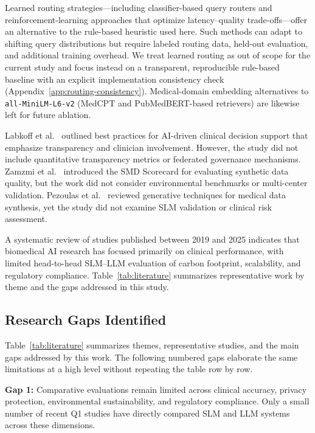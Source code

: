 Learned routing strategies---including classifier-based query routers and reinforcement-learning approaches that optimize latency--quality trade-offs---offer an alternative to the rule-based heuristic used here. Such methods can adapt to shifting query distributions but require labeled routing data, held-out evaluation, and additional training overhead. We treat learned routing as out of scope for the current study and focus instead on a transparent, reproducible rule-based baseline with an explicit implementation consistency check (Appendix~\ref{app:routing-consistency}). Medical-domain embedding alternatives to \texttt{all-MiniLM-L6-v2} (MedCPT and PubMedBERT-based retrievers) are likewise left for future ablation.

Labkoff et al.~\cite{labkoff2024aicds} outlined best practices for AI-driven clinical decision support that emphasize transparency and clinician involvement. However, the study did not include quantitative transparency metrics or federated governance mechanisms. Zamzmi et al.~\cite{zamzmi2025smd} introduced the SMD Scorecard for evaluating synthetic data quality, but the work did not consider environmental benchmarks or multi-center validation. Pezoulas et al.~\cite{pezoulas2023generative} reviewed generative techniques for medical data synthesis, yet the study did not examine SLM validation or clinical risk assessment.

A systematic review of studies published between 2019 and 2025 indicates that biomedical AI research has focused primarily on clinical performance, with limited head-to-head SLM--LLM evaluation of carbon footprint, scalability, and regulatory compliance. Table~\ref{tab:literature} summarizes representative work by theme and the gaps addressed in this study.

\subsection{Research Gaps Identified}
\label{subsec:researchgaps}

Table~\ref{tab:literature} summarizes themes, representative studies, and the main gaps addressed by this work. The following numbered gaps elaborate the same limitations at a high level without repeating the table row by row.

\textbf{Gap 1:} Comparative evaluations remain limited across clinical accuracy, privacy protection, environmental sustainability, and regulatory compliance. Only a small number of recent Q1 studies have directly compared SLM and LLM systems across these dimensions.


